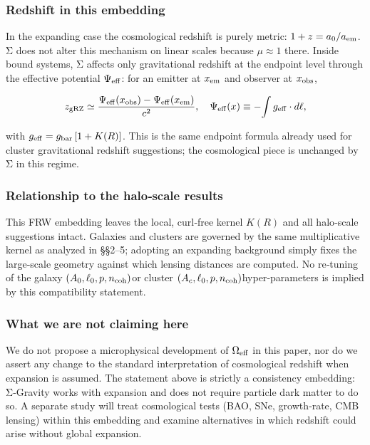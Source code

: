 \documentclass[11pt,a4paper]{article}
\begin{document}
\subsubsection{Redshift in this embedding}


In the expanding case the cosmological redshift is purely metric: $1+z = a_0/a_{\rm em}$. Σ does not alter this mechanism on linear scales because $\mu \approx 1$ there. Inside bound systems, Σ affects only gravitational redshift at the endpoint level through the effective potential $\Psi_{\rm eff}$: for an emitter at $x_{\rm em}$ and observer at $x_{\rm obs}$,


\begin{equation}
z_{\rm gRZ} \simeq \frac{\Psi_{\rm eff}(x_{\rm obs}) - \Psi_{\rm eff}(x_{\rm em})}{c^2}, \quad \Psi_{\rm eff}(x) \equiv -\!\int g_{\rm eff}\cdot d\ell,
\end{equation}


with $\allowbreak g_{\rm eff} = g_{\rm bar}\,[1 + K(R)]$\allowbreak . This is the same endpoint formula already used for cluster gravitational redshift suggestions; the cosmological piece is unchanged by Σ in this regime.


\subsubsection{Relationship to the halo‑scale results}


This FRW embedding leaves the local, curl‑free kernel $K(R)$ and all halo‑scale suggestions intact. Galaxies and clusters are governed by the same multiplicative kernel as analyzed in §§2–5; adopting an expanding background simply fixes the large‑scale geometry against which lensing distances are computed. No re‑tuning of the galaxy $\allowbreak (A_0, \ell_0, p, n_{\rm coh})$\allowbreak  or cluster $\allowbreak (A_c, \ell_0, p, n_{\rm coh})$\allowbreak  hyper‑parameters is implied by this compatibility statement.


\subsubsection{What we are not claiming here}


We do not propose a microphysical development of $\Omega_{\rm eff}$ in this paper, nor do we assert any change to the standard interpretation of cosmological redshift when expansion is assumed. The statement above is strictly a consistency embedding: Σ‑Gravity works with expansion and does not require particle dark matter to do so. A separate study will treat cosmological tests (BAO, SNe, growth‑rate, CMB lensing) within this embedding and examine alternatives in which redshift could arise without global expansion.
\end{document}
